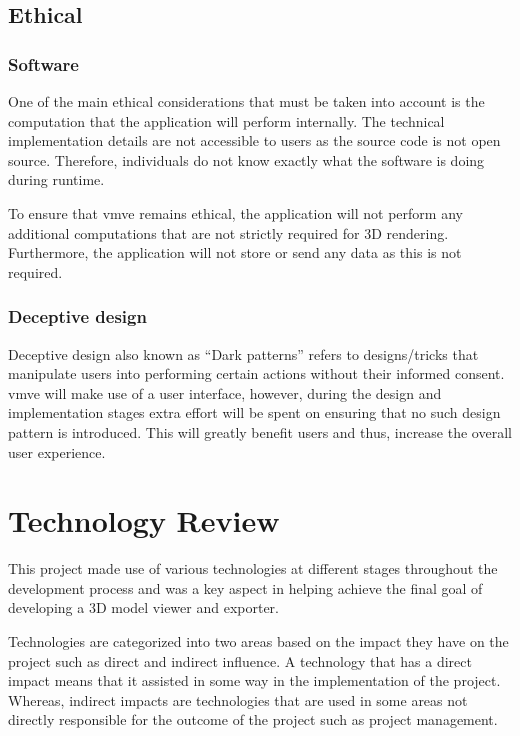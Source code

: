 \documentclass[11pt]{article}
\begin{document}
\subsection{Ethical}


\subsubsection{Software}
One of the main ethical considerations that must be taken into account is the
computation that the application will perform internally. The technical
implementation details are not accessible to users as the source code is not
open source. Therefore, individuals do not know exactly what the software is
doing during runtime.

To ensure that \gls*{vmve} remains ethical, the application will not perform any
additional computations that are not strictly required for 3D rendering.
Furthermore, the application will not store or send any data as this is not
required.

\subsubsection{Deceptive design}
Deceptive design also known as ``Dark patterns'' refers to designs/tricks that
manipulate users into performing certain actions without their informed consent.
\gls*{vmve} will make use of a user interface, however, during the design and
implementation stages extra effort will be spent on ensuring that no such design
pattern is introduced. This will greatly benefit users and thus, increase the
overall user experience.

\clearpage
\section{Technology Review} \label{technology_review}
This project made use of various technologies at different stages throughout the
development process and was a key aspect in helping achieve the final goal of
developing a 3D model viewer and exporter.

Technologies are categorized into two areas based on the impact they have on the
project such as direct and indirect influence. A technology that has a direct
impact means that it assisted in some way in the implementation of the project.
Whereas, indirect impacts are technologies that are used in some areas not
directly responsible for the outcome of the project such as project management.
\end{document}
